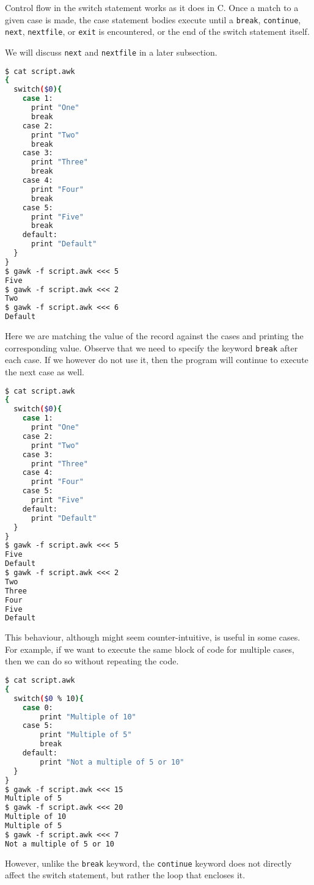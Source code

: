 Control flow in the switch statement works as it does in C.
Once a match to a given case is made, the case statement bodies execute until a \lstinline|break|,
\lstinline|continue|, \lstinline|next|, \lstinline|nextfile|, or \lstinline|exit| is encountered,
or the end of the switch statement itself.

We will discuss \lstinline|next| and \lstinline|nextfile| in a later subsection.

\begin{lstlisting}[language=bash]
$ cat script.awk
{
  switch($0){
    case 1:
      print "One"
      break
    case 2:
      print "Two"
      break
    case 3:
      print "Three"
      break
    case 4:
      print "Four"
      break
    case 5:
      print "Five"
      break
    default:
      print "Default"
  }
}
$ gawk -f script.awk <<< 5
Five
$ gawk -f script.awk <<< 2
Two
$ gawk -f script.awk <<< 6
Default
\end{lstlisting}

Here we are matching the value of the record against the cases and printing the corresponding value.
Observe that we need to specify the keyword \lstinline|break| after each case.
If we however do not use it, then the program will continue to execute the next case as well.

\begin{lstlisting}[language=bash]
$ cat script.awk
{
  switch($0){
    case 1:
      print "One"
    case 2:
      print "Two"
    case 3:
      print "Three"
    case 4:
      print "Four"
    case 5:
      print "Five"
    default:
      print "Default"
  }
}
$ gawk -f script.awk <<< 5
Five
Default
$ gawk -f script.awk <<< 2
Two
Three
Four
Five
Default
\end{lstlisting}

This behaviour, although might seem counter-intuitive, is useful in some cases.
For example, if we want to execute the same block of code for multiple cases, then we can do so without repeating the code.

\begin{lstlisting}[language=bash]
$ cat script.awk
{
  switch($0 % 10){
    case 0: 
        print "Multiple of 10"
    case 5:
        print "Multiple of 5"
        break
    default:
        print "Not a multiple of 5 or 10"
  }
}
$ gawk -f script.awk <<< 15
Multiple of 5
$ gawk -f script.awk <<< 20
Multiple of 10
Multiple of 5
$ gawk -f script.awk <<< 7
Not a multiple of 5 or 10
\end{lstlisting}

However, unlike the \lstinline|break| keyword, the \lstinline|continue| keyword does not directly affect the switch statement, but rather the loop that encloses it.

